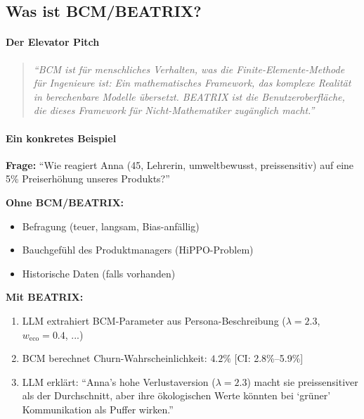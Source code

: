 \subsection*{Was ist BCM/BEATRIX?}

\paragraph{Der Elevator Pitch}

\begin{quote}
\textit{``BCM ist für menschliches Verhalten, was die Finite-Elemente-Methode für Ingenieure ist: Ein mathematisches Framework, das komplexe Realität in berechenbare Modelle übersetzt. BEATRIX ist die Benutzeroberfläche, die dieses Framework für Nicht-Mathematiker zugänglich macht.''}
\end{quote}

\paragraph{Ein konkretes Beispiel}

\textbf{Frage:} ``Wie reagiert Anna (45, Lehrerin, umweltbewusst, preissensitiv) auf eine 5\% Preiserhöhung unseres Produkts?''

\textbf{Ohne BCM/BEATRIX:}
\begin{itemize}
    \item Befragung (teuer, langsam, Bias-anfällig)
    \item Bauchgefühl des Produktmanagers (HiPPO-Problem)
    \item Historische Daten (falls vorhanden)
\end{itemize}

\textbf{Mit BEATRIX:}
\begin{enumerate}
    \item LLM extrahiert BCM-Parameter aus Persona-Beschreibung ($\lambda = 2.3$, $w_{\text{eco}} = 0.4$, ...)
    \item BCM berechnet Churn-Wahrscheinlichkeit: $4.2\%$ [CI: 2.8\%--5.9\%]
    \item LLM erklärt: ``Anna's hohe Verlustaversion ($\lambda = 2.3$) macht sie preissensitiver als der Durchschnitt, aber ihre ökologischen Werte könnten bei `grüner' Kommunikation als Puffer wirken.''
\end{enumerate}

